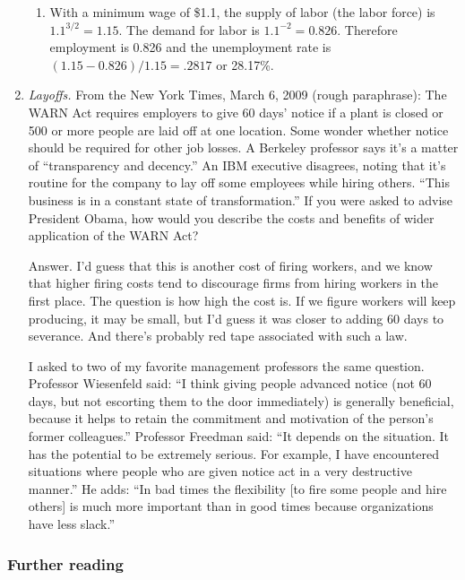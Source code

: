 \documentclass[letterpaper,12pt]{article}
\begin{document}
\begin{enumerate}
\begin{enumerate}
\item With a minimum wage of \$1.1, the supply of labor (the labor
force) is $1.1^{{3}/{2}} = 1.15$. The demand for labor is
$1.1^{-2}=0.826$. Therefore employment is 0.826 and the
unemployment rate is $(1.15-0.826)/{1.15}= .2817$ or 28.17\%.
\end{enumerate}


\item {\it Layoffs.\/}
From the New York Times, March 6, 2009 (rough paraphrase):   
The WARN Act requires employers to give 60 days' notice 
if a plant is closed or 500 or more people are laid off at one location.  
Some wonder whether notice should be required for other job losses.
A Berkeley professor says  
it's a matter of ``transparency and decency.'' 
An IBM executive disagrees, noting that it's routine for the company to lay off some employees while hiring others.  
``This business is in a constant state of transformation.''  
If you were asked to advise President Obama, 
how would you describe the costs and benefits of 
wider application of the WARN Act?  

Answer.  
I'd guess that this is another cost of firing workers, 
and we know that higher firing costs tend to discourage firms
from hiring workers in the first place.  
The question is how high the cost is.  
If we figure workers will keep producing, it may be small, 
but I'd guess it was closer to adding 60 days to severance.  
And there's probably red tape associated with such a law.  

I asked to two of my favorite management professors 
the same question.
Professor Wiesenfeld said:  
``I think giving people advanced notice (not 60 days, but not escorting them to the door immediately) is generally beneficial, 
because it helps to retain the commitment and motivation of the person's former colleagues.''
Professor Freedman said:  
``It depends on the situation.  It has the potential to be extremely serious. For example, I have encountered situations where people who are given notice act in a very destructive manner.''
He adds:  
``In bad times the flexibility [to fire some people and hire others] 
is much more important than in good times because organizations have less slack.''


\end{enumerate}

\subsubsection*{Further reading}
\end{document}
